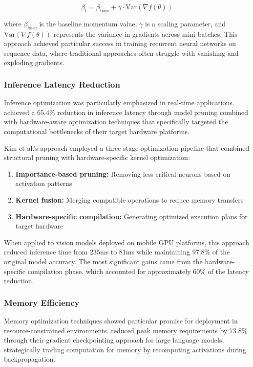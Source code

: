 \documentclass[acmsmall]{acmart}
\begin{document}
\begin{equation}\label{eq:adaptive-momentum}
    \beta_t = \beta_{\text{base}} + \gamma \cdot \text{Var}(\nabla f(\theta))
\end{equation}

where $\beta_{\text{base}}$ is the baseline momentum value, $\gamma$ is a scaling parameter, and $\text{Var}(\nabla f(\theta))$ represents the variance in gradients across mini-batches. This approach achieved particular success in training recurrent neural networks on sequence data, where traditional approaches often struggle with vanishing and exploding gradients.

\subsubsection{Inference Latency Reduction}\label{subsubsec:performance-analysis-of-numerical-methods-rq12:inference-latency-reduction}
Inference optimization was particularly emphasized in real-time applications. \citet{Kim2022} achieved a 65.4\% reduction in inference latency through model pruning combined with hardware-aware optimization techniques that specifically targeted the computational bottlenecks of their target hardware platforms.

Kim et al.'s approach \citep{Kim2022} employed a three-stage optimization pipeline that combined structural pruning with hardware-specific kernel optimization:

\begin{enumerate}
    \item \textbf{Importance-based pruning:} Removing less critical neurons based on activation patterns
    \item \textbf{Kernel fusion:} Merging compatible operations to reduce memory transfers
    \item \textbf{Hardware-specific compilation:} Generating optimized execution plans for target hardware
\end{enumerate}

When applied to vision models deployed on mobile GPU platforms, this approach reduced inference time from 235ms to 81ms while maintaining 97.8\% of the original model accuracy. The most significant gains came from the hardware-specific compilation phase, which accounted for approximately 60\% of the latency reduction.

\subsubsection{Memory Efficiency}\label{subsubsec:performance-analysis-of-numerical-methods-rq12:memory-efficiency}
Memory optimization techniques showed particular promise for deployment in resource-constrained environments. \citet{Lin2022} reduced peak memory requirements by 73.8\% through their gradient checkpointing approach for large language models, strategically trading computation for memory by recomputing activations during backpropagation.
\end{document}
